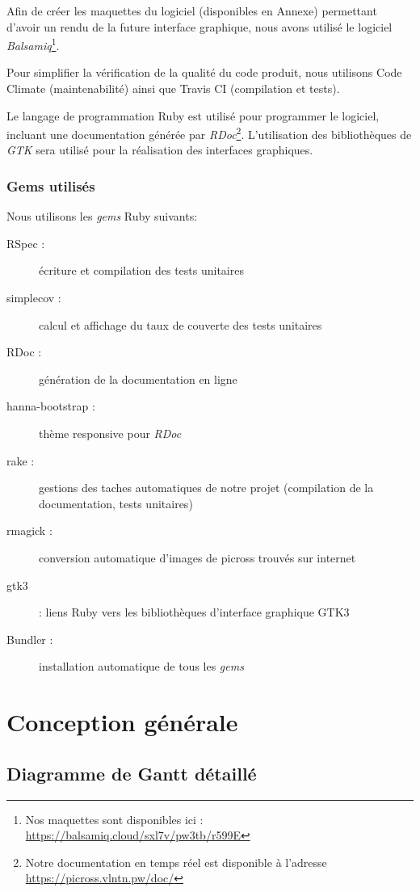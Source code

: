 \documentclass{report}
\makeatletter
\newcommand\footnoteref[1]{\protected@xdef\@thefnmark{\ref{#1}}\@footnotemark}
\makeatother
\begin{document}
	Afin de créer les maquettes du logiciel (disponibles en Annexe) permettant d’avoir un rendu de la future interface graphique, nous avons utilisé le logiciel \textit{Balsamiq}\footnote{Nos maquettes sont disponibles ici : \url{https://balsamiq.cloud/sxl7v/pw3tb/r599E}}.

	Pour simplifier la vérification de la qualité du code produit, nous utilisons Code Climate (maintenabilité) ainsi que Travis CI (compilation et tests).

	Le langage de programmation Ruby est utilisé pour programmer le logiciel, incluant une documentation générée par \textit{RDoc}\footnote{\label{rdoc}Notre documentation en temps réel est disponible à l'adresse \url{https://picross.vlntn.pw/doc/}}. L’utilisation des bibliothèques de \textit{GTK} sera utilisé pour la réalisation des interfaces graphiques.
	
	\subsection{Gems utilisés}
	Nous utilisons les \textit{gems} Ruby suivants:
	\begin{description}
	\item[RSpec :] écriture et compilation des tests unitaires
	\item[simplecov :] calcul et affichage du taux de couverte des tests unitaires
	\item[RDoc :] génération de la documentation en ligne \footnoteref{rdoc}
	\item[hanna-bootstrap :] thème responsive pour \textit{RDoc}
	\item[rake :] gestions des taches automatiques de notre projet (compilation de la documentation, tests unitaires)
	\item[rmagick :] conversion automatique d'images de picross trouvés sur internet
	\item[gtk3] : liens Ruby vers les bibliothèques d'interface graphique GTK3
	\item[Bundler :] installation automatique de tous les \textit{gems}
	\end{description}

		
\chapter{Conception générale}

    \section{Diagramme de Gantt détaillé}
    
\end{document}
